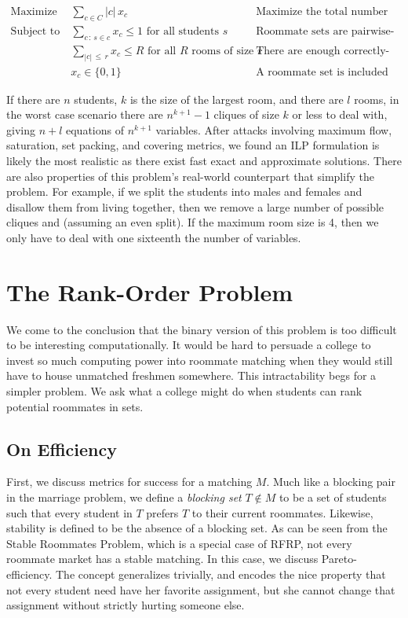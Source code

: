 \documentclass[12pt]{article}
\begin{document}
\begin{align*}
\text{Maximize }   & \sum_{c \in C} |c| \, x_c &&\text{Maximize the total number of students covered}\\
\text{Subject to } & \sum_{c \, : \, s \in c} x_c \leq 1 \text{ for all students $s$} && \text{Roommate sets are pairwise-disjoint}\\
& \sum_{|c| \, \leq \, r} x_c \leq R \text{ for all $R$ rooms of size $r$} && \text{There are enough correctly-sized rooms}\\
& x_c \in \{0, 1\} && \text{A roommate set is included or not}
\end{align*}

If there are $n$ students, $k$ is the size of the largest room, and there are $l$ rooms, in the worst case scenario there are $n^{k + 1} - 1$ cliques of size $k$ or less to deal with, giving $n + l$ equations of $n^{k + 1}$ variables.  After attacks involving maximum flow, saturation, set packing, and covering metrics, we found an ILP formulation is likely the most realistic as there exist fast exact and approximate solutions. There are also properties of this problem's real-world counterpart that simplify the problem. For example, if we split the students into males and females and disallow them from living together, then we remove a large number of possible cliques and (assuming an even split). If the maximum room size is 4, then we only have to deal with one sixteenth the number of variables.


\section*{The Rank-Order Problem}
We come to the conclusion that the binary version of this problem is too difficult to be interesting computationally. It would be hard to persuade a college to invest so much computing power into roommate matching when they would still have to house unmatched freshmen somewhere. This intractability begs for a simpler problem. We ask what a college might do when students can rank potential roommates in sets. 


\subsection*{On Efficiency}
First, we discuss metrics for success for a matching $M$. Much like a blocking pair in the marriage problem, we define a \textit{blocking set} $T \notin M$ to be a set of students such that every student in $T$ prefers $T$ to their current roommates. Likewise, stability is defined to be the absence of a blocking set. As can be seen from the Stable Roommates Problem, which is a special case of RFRP, not every roommate market has a stable matching. In this case, we discuss Pareto-efficiency. The concept generalizes trivially, and encodes the nice property that not every student need have her favorite assignment, but she cannot change that assignment without strictly hurting someone else. 
\end{document}
